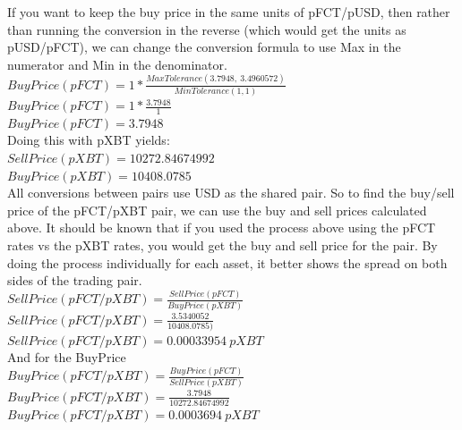 \documentclass[12pt]{article}
\begin{document}
    If you want to keep the buy price in the same units of pFCT/pUSD, then rather than running the conversion in the reverse (which would get the units as pUSD/pFCT), we can change the conversion formula to use Max in the numerator and Min in the denominator.  \\[10pt]
    $BuyPrice(pFCT) = 1 * \frac{MaxTolerance(3.7948,\ 3.4960572)}{MinTolerance(1, 1)}$  \\[4pt]
    $BuyPrice(pFCT) = 1 * \frac{3.7948}{1}$  \\[4pt]
    $BuyPrice(pFCT) = 3.7948$ \\
    
    Doing this with pXBT yields: \\[10pt]
    $SellPrice(pXBT)=10272.84674992$ \\[4pt]
    $BuyPrice(pXBT)=10408.0785$ \\
    
    All conversions between pairs use USD as the shared pair. So to find the buy/sell price of the pFCT/pXBT pair, we can use the buy and sell prices calculated above. It should be known that if you used the process above using the pFCT rates vs the pXBT rates, you would get the buy and sell price for the pair. By doing the process individually for each asset, it better shows the spread on both sides of the trading pair. \\[10pt]
    $SellPrice(pFCT/pXBT) = \frac{SellPrice(pFCT)}{BuyPrice(pXBT)}$ \\[4pt]
    $SellPrice(pFCT/pXBT) = \frac{3.5340052}{10408.0785)} $ \\[4pt]
    $SellPrice(pFCT/pXBT) = 0.00033954\ pXBT$ \\ 
    
    And for the BuyPrice  \\
    $BuyPrice(pFCT/pXBT) = \frac{BuyPrice(pFCT)}{SellPrice(pXBT)}$ \\[4pt]
    $BuyPrice(pFCT/pXBT) = \frac{3.7948}{10272.84674992}$ \\[4pt]
    $BuyPrice(pFCT/pXBT) = 0.0003694\ pXBT$

    
 
\end{document}
